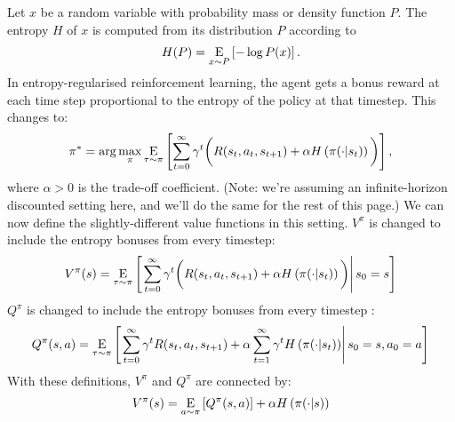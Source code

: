 \documentclass[letterpaper,10pt,english]{sphinxmanual}
\newcommand{\E}{{\mathrm E}}
\newcommand{\underE}[2]{\underset{\begin{subarray}{c}#1 \end{subarray}}{\E}\left[ #2 \right]}
\begin{document}
Let \(x\) be a random variable with probability mass or density function \(P\). The entropy \(H\) of \(x\) is computed from its distribution \(P\) according to
\begin{equation*}
\begin{split}H(P) = \underE{x \sim P}{-\log P(x)}.\end{split}
\end{equation*}
In entropy-regularised reinforcement learning, the agent gets a bonus reward at each time step proportional to the entropy of the policy at that timestep. This changes  to:
\begin{equation*}
\begin{split}\pi^* = \arg \max_{\pi} \underE{\tau \sim \pi}{ \sum_{t=0}^{\infty} \gamma^t \bigg( R(s_t, a_t, s_{t+1}) + \alpha H\left(\pi(\cdot|s_t)\right) \bigg)},\end{split}
\end{equation*}
where \(\alpha > 0\) is the trade-off coefficient. (Note: we’re assuming an infinite-horizon discounted setting here, and we’ll do the same for the rest of this page.) We can now define the slightly-different value functions in this setting. \(V^{\pi}\) is changed to include the entropy bonuses from every timestep:
\begin{equation*}
\begin{split}V^{\pi}(s) = \underE{\tau \sim \pi}{ \left. \sum_{t=0}^{\infty} \gamma^t \bigg( R(s_t, a_t, s_{t+1}) + \alpha H\left(\pi(\cdot|s_t)\right) \bigg) \right| s_0 = s}\end{split}
\end{equation*}
\(Q^{\pi}\) is changed to include the entropy bonuses from every timestep :
\begin{equation*}
\begin{split}Q^{\pi}(s,a) = \underE{\tau \sim \pi}{ \left. \sum_{t=0}^{\infty} \gamma^t  R(s_t, a_t, s_{t+1}) + \alpha \sum_{t=1}^{\infty} \gamma^t H\left(\pi(\cdot|s_t)\right)\right| s_0 = s, a_0 = a}\end{split}
\end{equation*}
With these definitions, \(V^{\pi}\) and \(Q^{\pi}\) are connected by:
\begin{equation*}
\begin{split}V^{\pi}(s) = \underE{a \sim \pi}{Q^{\pi}(s,a)} + \alpha H\left(\pi(\cdot|s)\right)\end{split}
\end{equation*}
\end{document}
